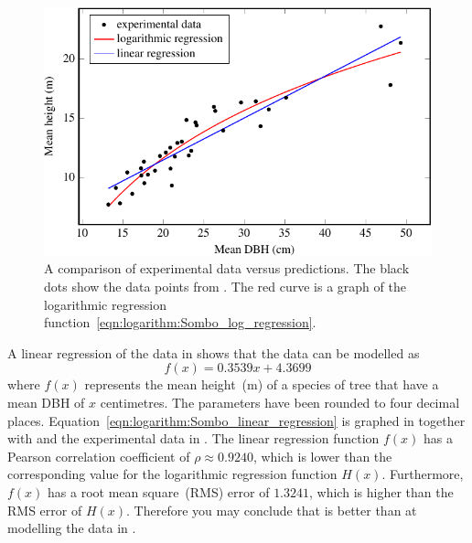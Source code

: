 \documentclass[a4paper,oneside,12pt]{article}
\begin{document}
{\begin{solution}
\begin{figure}[!htbp]
\centering
\includegraphics[scale=1.1]{image/12/sombo.pdf}
\caption{%
  A comparison of experimental data versus predictions.  The black
  dots show the data points from .  The red
  curve is a graph of the logarithmic regression
  function~\eqref{eqn:logarithm:Sombo_log_regression}.
}
\label{fig:logarithm:Sombo_log_regression}
\end{figure}

A linear regression of the data in  shows
that the data can be modelled as
\begin{equation}
\label{eqn:logarithm:Sombo_linear_regression}
f(x)
=
0.3539 x + 4.3699
\end{equation}
where $f(x)$ represents the mean height~(m) of a species of tree that
have a mean DBH of $x$ centimetres.  The parameters have been rounded
to four decimal places.
Equation~\eqref{eqn:logarithm:Sombo_linear_regression} is graphed in
 together with
 and the experimental
data in .  The linear regression function
$f(x)$ has a Pearson correlation coefficient of $\rho \approx 0.9240$,
which is lower than the corresponding value for the logarithmic
regression function $H(x)$.  Furthermore, $f(x)$ has a root mean
square~(RMS) error of $1.3241$, which is higher than the RMS error of
$H(x)$.  Therefore you may conclude that
 is better than
 at modelling the data
in .
\end{solution}
}{}
\end{document}
